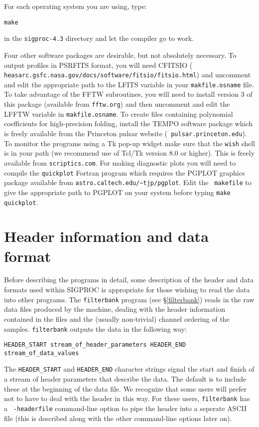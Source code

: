 \documentclass[11pt]{article}
\begin{document}
For each operating system you are using, type:

\noindent
{\tt make}

\noindent in the
{\tt sigproc-4.3} directory
and let the compiler go to work. 

Four other software packages are desirable, but not absolutely
necessary.  To output profiles in PSRFITS format, you will need
CFITSIO ({\tt 
heasarc.gsfc.nasa.gov/docs/software/fitsio/fitsio.html})
and uncomment and edit the appropriate path to the LFITS variable in your
{\tt makfile.osname} file. To take advantage of the FFTW subroutines,
you will need to install version 3 of this package (available from
{\tt fftw.org}) and then uncomment and edit the LFFTW variable in
{\tt makfile.osname}.
To create files containing polynomial coefficients for
high-precision folding, install the {\sc TEMPO} software package which
is freely available from the Princeton pulsar website ({\tt
pulsar.princeton.edu}).  To monitor the programs using a Tk
pop-up widget make sure that the {\tt wish} shell is in your path (we
recommend use of Tcl/Tk version 8.0 or higher). This is freely
available from {\tt scriptics.com}. For making diagnostic
plots you will need to compile the {\tt quickplot} Fortran program which
requires the {\sc PGPLOT} graphics package available from 
\verb+astro.caltech.edu/~tjp/pgplot+. Edit the {\tt
makefile} to give the appropriate path to {\sc PGPLOT} on your system
before typing {\tt make quickplot}.

\section{Header information and data format}
\label{dataformat}
Before describing the programs in detail, some description of the
header and data formats used within SIGPROC is appropriate for those
wishing to read the data into other programs.  The {\tt filterbank}
program (see \S \ref{filterbank}) reads in the raw data files produced
by the machine, dealing with the header information contained in the
files and the (usually non-trivial) channel ordering of the
samples. {\tt filterbank} outputs the data in the following way:
\begin{verbatim}
HEADER_START stream_of_header_parameters HEADER_END stream_of_data_values
\end{verbatim}
The \verb+HEADER_START+ and \verb+HEADER_END+ character strings
signal the start and
finish of a stream of header parameters that describe the data.  The
default is to include these at the beginning of the data file.  We
recognize that some users will prefer not to have to deal with the
header in this way. For these users, {\tt filterbank} has a {\tt
-headerfile} command-line option to pipe the header into a seperate
ASCII file (this is described along with the other command-line
options later on).
\end{document}
